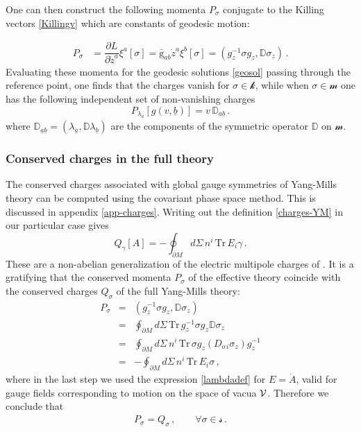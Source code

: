 \documentclass[11pt,a4paper]{article}
\def\calsk{\boldsymbol{\mathscr k}}
\def\calsm{{\boldsymbol{\mathscr m}}}
\def\calss{{\boldsymbol{\mathscr s}}}
\def\calv{{\cal V}}
\def\ua{{\underline{a}}}
\def\ub{{\underline{b}}}
\def\pd{\partial}
\def\rg{{\mathrm{g}}}
\def\Tr{\mathrm{Tr}}
\def\Dperp{{\mathbb{D}}}
\begin{document}
    One can then construct the following momenta $P_\sigma$ conjugate to the Killing vectors \eqref{Killingv} which are constants of geodesic motion:
    
    \begin{align}
    P_\sigma&=\dfrac{\pd L}{\pd \dot{z}^a}\xi^a[\sigma]=\bar{\rg}_{ab}\dot{z}^a\xi^b[\sigma]=(g_z^{-1}\sigma g_z,\Dperp \sigma_z)\,.
    \end{align}
    Evaluating these momenta for the geodesic solutions \eqref{geosol} passing through the reference point, one finds that the charges vanish for $\sigma\in\calsk$, while when $\sigma\in\calsm$ one has the following independent set of non-vanishing charges
    \begin{equation}
    P_{\lambda_{\ua}}[g(v,\ub)]=v\,\Dperp_{\ua\ub}\,.
    \end{equation}
 where $\Dperp_{\ua\ub}=(\lambda_\ua,\Dperp\lambda_\ub)$ are the components of the symmetric operator $\Dperp$ on $\calsm$.
    
    \subsubsection{Conserved charges in the full theory}
    The conserved charges associated with global gauge symmetries of Yang-Mills theory can be computed using the covariant phase space method. This is discussed in appendix \ref{app-charges}. Writing out the definition \eqref{charges-YM} in our particular case gives
    \begin{equation}
    Q_{\gamma}[A]=-\oint_{\partial M}\!\!d\Sigma\, n^i\,\Tr\,E_i\gamma\,.
    \end{equation}
    These are a non-abelian generalization of the electric multipole charges of \cite{Seraj:2016jxi}. It is a gratifying that the conserved momenta $P_\sigma$ of the effective theory coincide with the conserved charges $Q_\sigma$ of the full Yang-Mills theory:
    \begin{eqnarray}
\nonumber    P_\sigma&=&(g_z^{-1}\sigma g_z,\Dperp\sigma_z)\\
\nonumber    &=&\oint_{\partial M}d\Sigma\, \Tr\,g_z^{-1}\sigma g_z\Dperp\sigma_z\\
\nonumber    &=&\oint_{\partial M}d\Sigma\, n^i\,\Tr\,\sigma g_z(D_{o\,i}\sigma_z)g_z^{-1}\\
&=&-\oint_{\partial M}d\Sigma\, n^i\,\Tr\,E_i\sigma\,,
    \end{eqnarray}
    where in the last step we used the expression \eqref{lambdadef} for $E=\dot A$, valid for gauge fields corresponding to motion on the space of vacua $\calv$.
    Therefore we conclude that 
    \begin{align}
    \boxed{P_\sigma=Q_\sigma \,,\qquad \forall \sigma\in \calss\,.}
    \end{align} 
   
\end{document}

